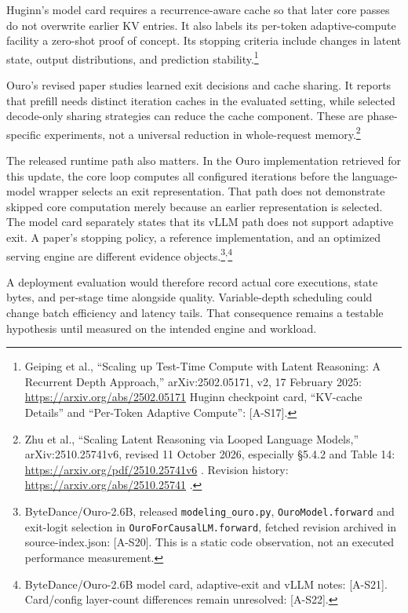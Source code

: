 Huginn's model card requires a recurrence-aware cache so that later core
passes do not overwrite earlier KV entries. It also labels its per-token
adaptive-compute facility a zero-shot proof of concept. Its stopping
criteria include changes in latent state, output distributions, and
prediction stability.\footnote{Geiping et al., ``Scaling up Test-Time
  Compute with Latent Reasoning: A Recurrent Depth Approach,''
  arXiv:2502.05171, v2, 17 February 2025:
  \url{https://arxiv.org/abs/2502.05171} Huginn checkpoint card, ``KV-cache
  Details'' and ``Per-Token Adaptive Compute'': \mbox{{[}A-S17{]}}.}

Ouro's revised paper studies learned exit decisions and cache sharing.
It reports that prefill needs distinct iteration caches in the evaluated
setting, while selected decode-only sharing strategies can reduce the
cache component. These are phase-specific experiments, not a universal
reduction in whole-request memory.\footnote{Zhu et al., ``Scaling Latent
  Reasoning via Looped Language Models,'' arXiv:2510.25741v6, revised 11
  October 2026, especially §5.4.2 and Table 14:
  \url{https://arxiv.org/pdf/2510.25741v6} . Revision history:
  \url{https://arxiv.org/abs/2510.25741} .}

The released runtime path also matters. In the Ouro implementation
retrieved for this update, the core loop computes all configured
iterations before the language-model wrapper selects an exit
representation. That path does not demonstrate skipped core computation
merely because an earlier representation is selected. The model card
separately states that its vLLM path does not support adaptive exit. A
paper's stopping policy, a reference implementation, and an optimized
serving engine are different evidence
objects.\footnote{ByteDance/Ouro-2.6B, released
  \texttt{modeling\_ouro.py}, \texttt{OuroModel.forward} and exit-logit
  selection in \texttt{OuroForCausalLM.forward}, fetched revision
  archived in source-index.json: \mbox{{[}A-S20{]}}. This is a static code
  observation, not an executed performance measurement.}\textsuperscript{,}\footnote{ByteDance/Ouro-2.6B
  model card, adaptive-exit and vLLM notes: \mbox{{[}A-S21{]}}. Card/config
  layer-count differences remain unresolved: \mbox{{[}A-S22{]}}.}

A deployment evaluation would therefore record actual core executions,
state bytes, and per-stage time alongside quality. Variable-depth
scheduling could change batch efficiency and latency tails. That
consequence remains a testable hypothesis until measured on the intended
engine and workload.

